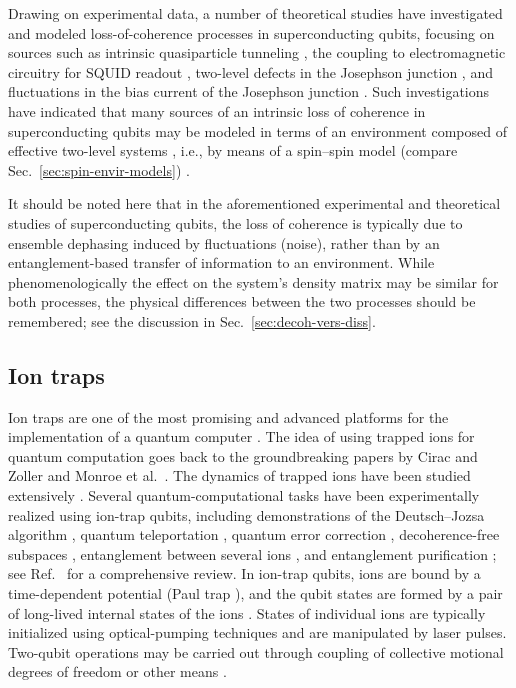 \documentclass[3p,sort&compress,12pt]{elsarticle}
\begin{document}
Drawing on experimental data, a number of theoretical studies have investigated and modeled loss-of-coherence processes in superconducting qubits, focusing on sources such as intrinsic quasiparticle tunneling \cite{Catelani:2012:zz},  the coupling to electromagnetic circuitry for SQUID readout \cite{Wal:2003:pp}, two-level defects in the Josephson junction \cite{Martinis:2005:zz}, and fluctuations in the bias current of the Josephson junction \cite{Martinis:2003:bz}. Such investigations have indicated that many sources of an intrinsic loss of coherence in superconducting qubits may be modeled in terms of an environment composed of effective two-level systems  \cite{Martinis:2002:qq,Martinis:2005:zz}, i.e., by means of a spin--spin model (compare Sec.~\ref{sec:spin-envir-models}) \cite{Dube:2001:zz,Prokofev:2000:zz}. 

It should be noted here that in the aforementioned experimental and theoretical studies of superconducting qubits, the loss of coherence is typically due to ensemble dephasing induced by fluctuations (noise), rather than by an entanglement-based transfer of information to an environment. While phenomenologically the effect on the system's density matrix may be similar for both processes, the physical differences between the two processes should be remembered; see the discussion in Sec.~\ref{sec:decoh-vers-diss}. 

\subsection{\label{sec:trapped}Ion traps}

Ion traps are one of the most promising and advanced platforms for the implementation of a quantum computer \cite{Haffner:2008:pp}. The idea of using trapped ions for quantum computation goes back to the groundbreaking papers by Cirac and Zoller \cite{Cirac:1995:tt} and Monroe et al.\ \cite{Monroe:1995:oo}. The dynamics of trapped ions have been studied extensively \cite{Leibfried:2003:om}. Several quantum-computational tasks have been experimentally realized using ion-trap qubits, including demonstrations of the Deutsch--Jozsa algorithm \cite{Deutsch:1989:mm}, quantum teleportation \cite{Barrett:2004:oo,Riebe:2004:qq}, quantum error correction \cite{Chiaverini:2004:aa}, decoherence-free subspaces \cite{Kielpinski:2001:uu,Roos:204:pp,Haffner:2005:zz,Langer:2005:uu},  entanglement between several ions \cite{Haffner:2005:sc}, and entanglement purification \cite{Reichle:2006:ii}; see Ref.~\cite{Haffner:2008:pp} for a comprehensive review. In ion-trap qubits, ions are bound by a time-dependent potential (Paul trap \cite{Paul:1990:oo,Leibfried:2003:om}), and the qubit states are formed by a pair of long-lived internal states of the ions \cite{Leibfried:2003:om,Haffner:2008:pp}. States of individual ions are typically initialized using optical-pumping techniques and are manipulated by laser pulses. Two-qubit operations may be carried out through coupling of collective motional degrees of freedom \cite{Cirac:1995:tt} or other means \cite{Haffner:2008:pp}.
\end{document}
